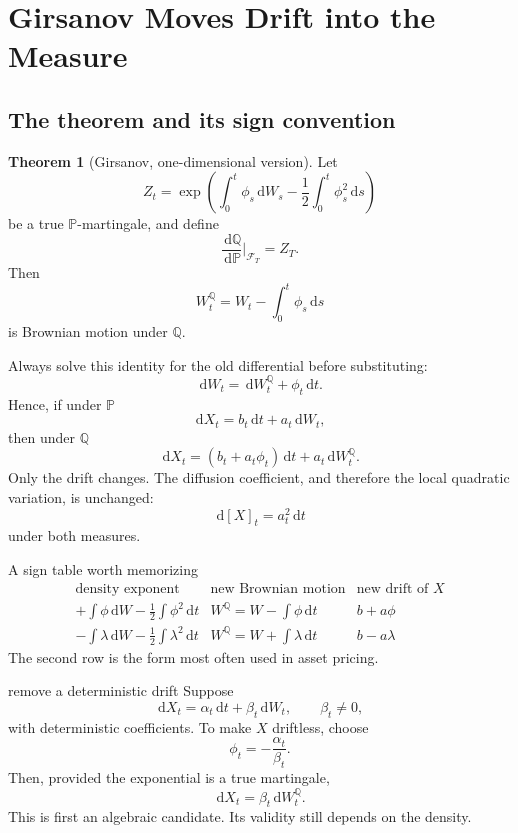 \documentclass[10pt]{article}
\newcommand{\Pp}{\mathbb P}
\newcommand{\Q}{\mathbb Q}
\newcommand{\1}{\mathbf 1}
\newcommand{\cF}{\mathcal F}
\newcommand{\dd}{\,\mathrm d}
\theoremstyle{definition}
\newtheorem{theorem}[definition]{Theorem}
\begin{document}
\section{Girsanov Moves Drift into the Measure}

\subsection{The theorem and its sign convention}

\begin{theorem}[Girsanov, one-dimensional version]
Let
\[
Z_t=\exp\!\left(
\int_0^t\phi_s\dd W_s
-\frac12\int_0^t\phi_s^2\dd s
\right)
\]
be a true \(\Pp\)-martingale, and define
\[
\frac{\dd\Q}{\dd\Pp}\bigg|_{\cF_T}=Z_T.
\]
Then
\[
\boxed{W_t^{\Q}=W_t-\int_0^t\phi_s\dd s}
\]
is Brownian motion under \(\Q\).
\end{theorem}

Always solve this identity for the old differential before substituting:
\[
\boxed{\dd W_t=\dd W_t^{\Q}+\phi_t\dd t.}
\]
Hence, if under \(\Pp\)
\[
\dd X_t=b_t\dd t+a_t\dd W_t,
\]
then under \(\Q\)
\[
\boxed{
\dd X_t=(b_t+a_t\phi_t)\dd t+a_t\dd W_t^{\Q}.}
\]
Only the drift changes. The diffusion coefficient, and therefore the local
quadratic variation, is unchanged:
\[
\dd[X]_t=a_t^2\dd t
\]
under both measures.

\begin{warningbox}{A sign table worth memorizing}
\[
\begin{array}{c|c|c}
\text{density exponent} & \text{new Brownian motion} & \text{new drift of }X\\ \hline
+\int\phi\dd W-\tfrac12\int\phi^2\dd t
& W^{\Q}=W-\int\phi\dd t & b+a\phi\\
-\int\lambda\dd W-\tfrac12\int\lambda^2\dd t
& W^{\Q}=W+\int\lambda\dd t & b-a\lambda
\end{array}
\]
The second row is the form most often used in asset pricing.
\end{warningbox}

\begin{boardexample}{remove a deterministic drift}
Suppose
\[
\dd X_t=\alpha_t\dd t+\beta_t\dd W_t,
\qquad \beta_t\neq0,
\]
with deterministic coefficients. To make \(X\) driftless, choose
\[
\phi_t=-\frac{\alpha_t}{\beta_t}.
\]
Then, provided the exponential is a true martingale,
\[
\dd X_t=\beta_t\dd W_t^{\Q}.
\]
This is first an algebraic candidate. Its validity still depends on the
density.
\end{boardexample}
\end{document}
